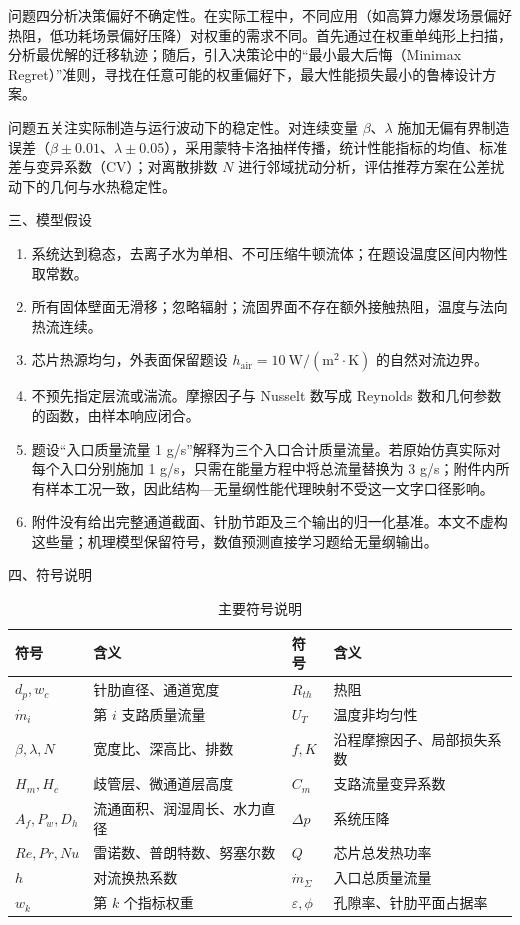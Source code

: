\documentclass[12pt]{article}
\newcommand{\sect}[1]{\par\vspace{12pt}\noindent\begin{center}{\fontsize{14pt}{20pt}\selectfont\hei #1}\end{center}\vspace{4pt}}
\newcommand{\subsect}[1]{\par\vspace{6pt}\noindent{\fontsize{12pt}{17pt}\selectfont\hei #1}\par\vspace{2pt}}
\begin{document}
\subsect{2.4\quad 问题四的分析}
问题四分析决策偏好不确定性。在实际工程中，不同应用（如高算力爆发场景偏好热阻，低功耗场景偏好压降）对权重的需求不同。首先通过在权重单纯形上扫描，分析最优解的迁移轨迹；随后，引入决策论中的``最小最大后悔（Minimax Regret）''准则，寻找在任意可能的权重偏好下，最大性能损失最小的鲁棒设计方案。

\subsect{2.5\quad 问题五的分析}
问题五关注实际制造与运行波动下的稳定性。对连续变量 $\beta$、$\lambda$ 施加无偏有界制造误差（$\beta \pm 0.01$、$\lambda \pm 0.05$），采用蒙特卡洛抽样传播，统计性能指标的均值、标准差与变异系数（CV）；对离散排数 $N$ 进行邻域扰动分析，评估推荐方案在公差扰动下的几何与水热稳定性。

\sect{三、模型假设}
\begin{enumerate}[leftmargin=2.5em,itemsep=0pt]
  \item 系统达到稳态，去离子水为单相、不可压缩牛顿流体；在题设温度区间内物性取常数。
  \item 所有固体壁面无滑移；忽略辐射；流固界面不存在额外接触热阻，温度与法向热流连续。
  \item 芯片热源均匀，外表面保留题设 $h_{\mathrm{air}} = 10\ \mathrm{W/(m^2\cdot K)}$ 的自然对流边界。
  \item 不预先指定层流或湍流。摩擦因子与 Nusselt 数写成 Reynolds 数和几何参数的函数，由样本响应闭合。
  \item 题设``入口质量流量 1 g/s''解释为三个入口合计质量流量。若原始仿真实际对每个入口分别施加 1 g/s，只需在能量方程中将总流量替换为 3 g/s；附件内所有样本工况一致，因此结构—无量纲性能代理映射不受这一文字口径影响。
  \item 附件没有给出完整通道截面、针肋节距及三个输出的归一化基准。本文不虚构这些量；机理模型保留符号，数值预测直接学习题给无量纲输出。
\end{enumerate}

\sect{四、符号说明}
\begin{table}[htbp]
  \centering
  \caption{主要符号说明}
  \small
  \setlength{\tabcolsep}{5pt}
  \begin{tabular}{llll}
    \toprule
    符号 & 含义 & 符号 & 含义 \\
    \midrule
    $d_p,w_c$ & 针肋直径、通道宽度 & $R_{th}$ & 热阻 \\
    $\dot m_i$ & 第 $i$ 支路质量流量 & $U_T$ & 温度非均匀性 \\
    $\beta,\lambda,N$ & 宽度比、深高比、排数 & $f,K$ & 沿程摩擦因子、局部损失系数 \\
    $H_m,H_c$ & 歧管层、微通道层高度 & $C_m$ & 支路流量变异系数 \\
    $A_f,P_w,D_h$ & 流通面积、润湿周长、水力直径 & $\Delta p$ & 系统压降 \\
    $Re,Pr,Nu$ & 雷诺数、普朗特数、努塞尔数 & $Q$ & 芯片总发热功率 \\
    $h$ & 对流换热系数 & $\dot m_\Sigma$ & 入口总质量流量 \\
    $w_k$ & 第 $k$ 个指标权重 & $\varepsilon, \phi$ & 孔隙率、针肋平面占据率 \\
    \bottomrule
  \end{tabular}
\end{table}
\end{document}
